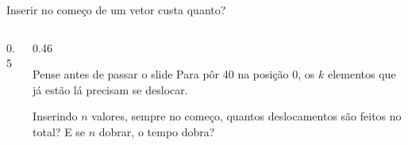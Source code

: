 \documentclass[aspectratio=169]{beamer}
\begin{document}
\begin{frame}{Inserir no começo de um vetor custa quanto?}
  \begin{columns}[c]
    \begin{column}{0.5\textwidth}
      \begin{center}
      \end{center}
    \end{column}
    \begin{column}{0.46\textwidth}
      \begin{block}{Pense antes de passar o slide}
        \small Para pôr 40 na posição 0, os $k$ elementos que já estão lá
        precisam se deslocar.

        \medskip
        Inserindo $n$ valores, sempre no começo, quantos deslocamentos são
        feitos no total? E se $n$ dobrar, o tempo dobra?
      \end{block}
    \end{column}
  \end{columns}
\end{frame}
\end{document}
